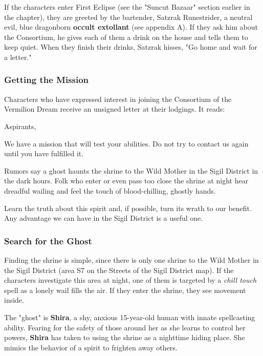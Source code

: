 \documentclass[10pt,a4paper,twoside,fancy,bg=print,twocolumn,openany,nodeprecatedcode]{dndbook}
\begin{document}
If the characters enter First Eclipse (see the "Suncut Bazaar" section earlier in the chapter), they are greeted by the bartender, Satzrak Runestrider, a neutral evil, blue dragonborn \textbf{occult extollant} (see appendix A). If they ask him about the Consortium, he gives each of them a drink on the house and tells them to keep quiet. When they finish their drinks, Satzrak hisses, "Go home and wait for a letter."

\subsubsection{Getting the Mission}
Characters who have expressed interest in joining the Consortium of the Vermilion Dream receive an unsigned letter at their lodgings. It reads:

\begin{DndReadAloud}{}
Aspirants,

We have a mission that will test your abilities. Do not try to contact us again until you have fulfilled it.

Rumors say a ghost haunts the shrine to the Wild Mother in the Sigil District in the dark hours. Folk who enter or even pass too close the shrine at night hear dreadful wailing and feel the touch of blood-chilling, ghostly hands.

Learn the truth about this spirit and, if possible, turn its wrath to our benefit. Any advantage we can have in the Sigil District is a useful one.

\end{DndReadAloud}

\subsubsection{Search for the Ghost}
Finding the shrine is simple, since there is only one shrine to the Wild Mother in the Sigil District (area S7 on the Streets of the Sigil District map). If the characters investigate this area at night, one of them is targeted by a \textit{chill touch} spell as a lonely wail fills the air. If they enter the shrine, they see movement inside.

The "ghost" is \textbf{Shira}, a shy, anxious 15-year-old human with innate spellcasting ability. Fearing for the safety of those around her as she learns to control her powers, \textbf{Shira} has taken to using the shrine as a nighttime hiding place. She mimics the behavior of a spirit to frighten away others.
\end{document}
